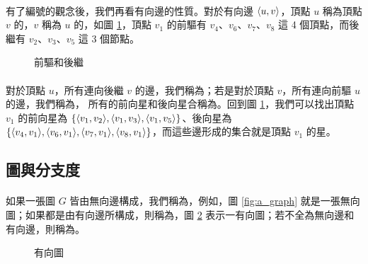 \documentclass[12pt,a4paper,oneside]{report}
\begin{document}
\begin{CJK}{UTF8}{bkai}
\paragraph{}有了編號的觀念後，我們再看有向邊的性質。對於有向邊 $\langle{}{{u},{v}}\rangle{}$，頂點 $u$ 稱為頂點 $v$ 的，$v$ 稱為 $u$ 的，如圖 \ref{fig:graph_star}，頂點 $v_1$ 的前驅有 $v_4$、$v_6$、$v_7$、$v_8$ 這 4 個頂點，而後繼有 $v_2$、$v_3$、$v_5$ 這 3 個節點。
\begin{figure}[h!]
\centering
{}
\caption{前驅和後繼}
\label{fig:graph_star}
\end{figure}

\paragraph{}對於頂點 $u$，所有連向後繼 $v$ 的邊，我們稱為\textbf{}；若是對於頂點 $v$，所有連向前驅 $u$ 的邊，我們稱為， 所有的前向星和後向星合稱為。回到圖 \ref{fig:graph_star}，我們可以找出頂點 $v_1$ 的前向星為 $\{\langle{}{{v_1},{v_2}}\rangle{},\langle{}{{v_1},{v_3}}\rangle{},\langle{}{{v_1},{v_5}}\rangle{}\}$、後向星為 $\{{\langle{}{{v_4},{v_1}}\rangle{},\langle{}{{v_6},{v_1}}\rangle{},\langle{}{{v_7},{v_1}}\rangle{},\langle{}{{v_8},{v_1}}\rangle{}}\}$，而這些邊形成的集合就是頂點 $v_1$ 的星。

\subsection{圖與分支度}
\paragraph{}如果一張圖 $G$ 皆由無向邊構成，我們稱為\textbf{}，例如，圖 \ref{fig:a_graph} 就是一張無向圖；如果都是由有向邊所構成，則稱為\textbf{}，圖 \ref{fig:directed_graph} 表示一有向圖；若不全為無向邊和有向邊，則稱為。
\begin{figure}[h!]
\centering
{}
\caption{有向圖}
\label{fig:directed_graph}
\end{figure}


\end{CJK}
\end{document}
